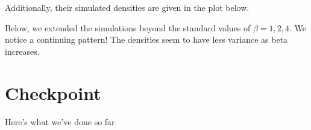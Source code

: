 Additionally, their simulated densities are given in the plot below.




\newpage


Below, we extended the simulations beyond the standard values of $\beta = 1,2,4$. We notice a continuing pattern! The densities seem to have less variance as
beta increases.



\newpage
\section{Checkpoint}

Here's what we've done so far.



